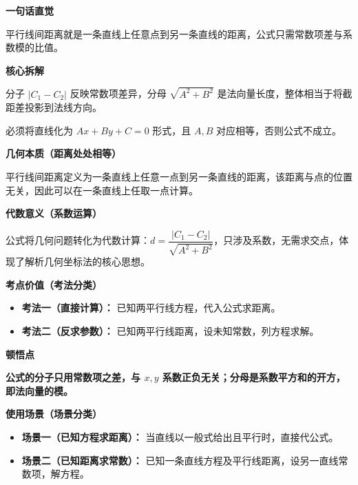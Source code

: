 \begin{explanationbox}
	\textbf{\textcolor{CExplanation}{一句话直觉}}

	平行线间距离就是一条直线上任意点到另一条直线的距离，公式只需常数项差与系数模的比值。

	\medskip
	\textbf{\textcolor{CExplanation}{核心拆解}}
	\begin{description}[style=nextline, leftmargin=2.8em, labelsep=0.5em, itemsep=0.45em]
		\item[\textbf{要点一（公式结构）：}] 分子 $|C_1-C_2|$ 反映常数项差异，分母 $\sqrt{A^2+B^2}$ 是法向量长度，整体相当于将截距差投影到法线方向。
		\item[\textbf{要点二（适用前提）：}] 必须将直线化为 $Ax+By+C=0$ 形式，且 $A,B$ 对应相等，否则公式不成立。
	\end{description}

	\medskip
	\textbf{\textcolor{CExplanation}{几何本质（距离处处相等）}}

	平行线间距离定义为一条直线上任意一点到另一条直线的距离，该距离与点的位置无关，因此可以在一条直线上任取一点计算。

	\medskip
	\textbf{\textcolor{CExplanation}{代数意义（系数运算）}}

	公式将几何问题转化为代数计算：$d = \dfrac{|C_1-C_2|}{\sqrt{A^2+B^2}}$，只涉及系数，无需求交点，体现了解析几何坐标法的核心思想。

	\medskip
	\textbf{\textcolor{CExplanation}{考点价值（考法分类）}}
	\begin{itemize}[leftmargin=*, itemsep=0.5em, topsep=0.4em]
		\item \textbf{考法一（直接计算）：} 已知两平行线方程，代入公式求距离。
		\item \textbf{考法二（反求参数）：} 已知两平行线距离，设未知常数，列方程求解。
	\end{itemize}

	\medskip
	\textbf{\textcolor{CExplanation}{顿悟点}}

	\textbf{公式的分子只用常数项之差，与 $x,y$ 系数正负无关；分母是系数平方和的开方，即法向量的模。}

	\medskip
	\textbf{\textcolor{CExplanation}{使用场景（场景分类）}}
	\begin{itemize}[leftmargin=*, itemsep=0.5em, topsep=0.4em]
		\item \textbf{场景一（已知方程求距离）：} 当直线以一般式给出且平行时，直接代公式。
		\item \textbf{场景二（已知距离求常数）：} 已知一条直线方程及平行线距离，设另一直线常数项，解方程。
	\end{itemize}
\end{explanationbox}
